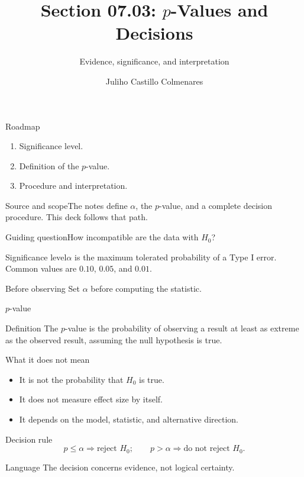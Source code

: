 \documentclass[10pt,aspectratio=169]{beamer}
\title[$p$-values and decisions]{Section 07.03: $p$-Values and Decisions}\subtitle{Evidence, significance, and interpretation}
\author[J. Castillo Colmenares]{Juliho Castillo Colmenares}\institute{Tecnológico de Monterrey}\date{}
\begin{document}
\begin{frame}[plain]\titlepage\end{frame}
\begin{frame}{Roadmap}\small\begin{enumerate}\item Significance level.\item Definition of the $p$-value.\item Procedure and interpretation.\end{enumerate}\end{frame}
\begin{frame}{Source and scope}\small The notes define $\alpha$, the $p$-value, and a complete decision procedure. This deck follows that path.\begin{block}{Guiding question}How incompatible are the data with $H_0$?\end{block}\end{frame}
\begin{frame}{Significance level}\small $\alpha$ is the maximum tolerated probability of a Type I error. Common values are $0.10$, $0.05$, and $0.01$.\begin{alertblock}{Before observing} Set $\alpha$ before computing the statistic.\end{alertblock}\end{frame}
\begin{frame}{$p$-value}\small\begin{block}{Definition} The $p$-value is the probability of observing a result at least as extreme as the observed result, assuming the null hypothesis is true.\end{block}\end{frame}
\begin{frame}{What it does not mean}\small\begin{itemize}\item It is not the probability that $H_0$ is true.\item It does not measure effect size by itself.\item It depends on the model, statistic, and alternative direction.\end{itemize}\end{frame}
\begin{frame}{Decision rule}\small\[p\leq\alpha\Rightarrow\text{reject }H_0;\qquad p>\alpha\Rightarrow\text{do not reject }H_0.\]\begin{block}{Language} The decision concerns evidence, not logical certainty.\end{block}\end{frame}
\end{document}
